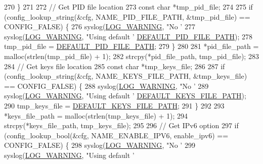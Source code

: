 \begin{DoxyCode}
{{{270     \}
271 
272     \textcolor{comment}{// Get PID file location}
273     \textcolor{keyword}{const} \textcolor{keywordtype}{char} *tmp\_pid\_file;
274 
275     \textcolor{keywordflow}{if} (config\_lookup\_string(&cfg, NAME\_PID\_FILE\_PATH, &tmp\_pid\_file) == CONFIG\_FALSE) \{
276         syslog(\hyperlink{logger_8h_aa5a9053636a30269210c54e734e0d583a8f6fe15bfe15104da6d1b360194a5400}{LOG\_WARNING}, \textcolor{stringliteral}{"No '%
277         syslog(\hyperlink{logger_8h_aa5a9053636a30269210c54e734e0d583a8f6fe15bfe15104da6d1b360194a5400}{LOG\_WARNING}, \textcolor{stringliteral}{"Using default '%
      \hyperlink{tox-bootstrapd_8c_a3229500bf4d840c088746e1a6482210d}{DEFAULT\_PID\_FILE\_PATH});
278         tmp\_pid\_file = \hyperlink{tox-bootstrapd_8c_a3229500bf4d840c088746e1a6482210d}{DEFAULT\_PID\_FILE\_PATH};
279     \}
280 
281     *pid\_file\_path = malloc(strlen(tmp\_pid\_file) + 1);
282     strcpy(*pid\_file\_path, tmp\_pid\_file);
283 
284     \textcolor{comment}{// Get keys file location}
285     \textcolor{keyword}{const} \textcolor{keywordtype}{char} *tmp\_keys\_file;
286 
287     \textcolor{keywordflow}{if} (config\_lookup\_string(&cfg, NAME\_KEYS\_FILE\_PATH, &tmp\_keys\_file) == CONFIG\_FALSE) \{
288         syslog(\hyperlink{logger_8h_aa5a9053636a30269210c54e734e0d583a8f6fe15bfe15104da6d1b360194a5400}{LOG\_WARNING}, \textcolor{stringliteral}{"No '%
289         syslog(\hyperlink{logger_8h_aa5a9053636a30269210c54e734e0d583a8f6fe15bfe15104da6d1b360194a5400}{LOG\_WARNING}, \textcolor{stringliteral}{"Using default '%
      \hyperlink{tox-bootstrapd_8c_a1bdc61234638275814834465df95908a}{DEFAULT\_KEYS\_FILE\_PATH});
290         tmp\_keys\_file = \hyperlink{tox-bootstrapd_8c_a1bdc61234638275814834465df95908a}{DEFAULT\_KEYS\_FILE\_PATH};
291     \}
292 
293     *keys\_file\_path = malloc(strlen(tmp\_keys\_file) + 1);
294     strcpy(*keys\_file\_path, tmp\_keys\_file);
295 
296     \textcolor{comment}{// Get IPv6 option}
297     \textcolor{keywordflow}{if} (config\_lookup\_bool(&cfg, NAME\_ENABLE\_IPV6, enable\_ipv6) == CONFIG\_FALSE) \{
298         syslog(\hyperlink{logger_8h_aa5a9053636a30269210c54e734e0d583a8f6fe15bfe15104da6d1b360194a5400}{LOG\_WARNING}, \textcolor{stringliteral}{"No '%
299         syslog(\hyperlink{logger_8h_aa5a9053636a30269210c54e734e0d583a8f6fe15bfe15104da6d1b360194a5400}{LOG\_WARNING}, \textcolor{stringliteral}{"Using default '%
}}}}}}}}}
\end{DoxyCode}
